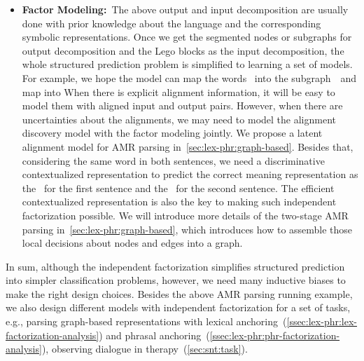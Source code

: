 {\begin{itemize}
\item \textbf{Factor Modeling:}~The above output and input
  decomposition are usually done with prior knowledge about the
  language and the corresponding symbolic representations. Once we get
  the segmented nodes or subgraphs for output decomposition and the
  Lego blocks as the input decomposition, the whole structured
  prediction problem is simplified to learning a set of models. For
  example, we hope the model can map the words~ into
  the subgraph~~and map 
  into  When there is explicit alignment
  information, it will be easy to model them with aligned input and
  output pairs. However, when there are uncertainties about the
  alignments, we may need to model the alignment discovery model with
  the factor modeling jointly. We propose a latent alignment model for
  AMR parsing in~\autoref{sec:lex-phr:graph-based}. Besides that,
  considering the same word  in both sentences, we need
  a discriminative contextualized representation to predict the
  correct meaning representation as the~ for the
  first sentence and the~ for the second
  sentence. The efficient contextualized representation is also the
  key to making such independent factorization possible. We will
  introduce more details of the two-stage AMR parsing
  in~\autoref{sec:lex-phr:graph-based}, which introduces how to
  assemble those local decisions about nodes and edges into a graph.
\end{itemize}

In sum, although the independent factorization simplifies structured
prediction into simpler classification problems, however, we need many
inductive biases to make the right design choices. Besides the above
AMR parsing running example, we also design different models with
independent factorization for a set of tasks, e.g., parsing
graph-based representations with
lexical anchoring~(\autoref{ssec:lex-phr:lex-factorization-analysis})
and
phrasal anchoring~(\autoref{ssec:lex-phr:phr-factorization-analysis}),
observing dialogue in therapy~(\autoref{sec:snt:task}).

}
